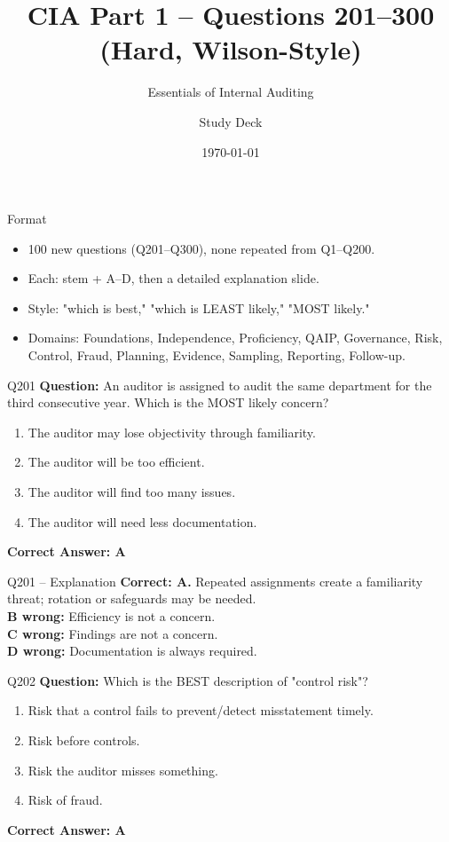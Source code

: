 \documentclass[aspectratio=169,10pt]{beamer}
\title{CIA Part 1 -- Questions 201--300 (Hard, Wilson-Style)}
\subtitle{Essentials of Internal Auditing}
\author{Study Deck}
\date{\today}
\begin{document}
	
	\begin{frame}
		\titlepage
	\end{frame}
	
	\begin{frame}{Format}
		\begin{itemize}
			\item 100 new questions (Q201--Q300), none repeated from Q1--Q200.
			\item Each: stem + A--D, then a detailed explanation slide.
			\item Style: "which is best," "which is LEAST likely," "MOST likely."
			\item Domains: Foundations, Independence, Proficiency, QAIP, Governance, Risk, Control, Fraud, Planning, Evidence, Sampling, Reporting, Follow-up.
		\end{itemize}
	\end{frame}
	
	\begin{frame}[t]{Q201}
		\small
		\textbf{Question:} An auditor is assigned to audit the same department for the third consecutive year. Which is the MOST likely concern?
		\begin{enumerate}[label=\Alph*.,itemsep=1pt,topsep=2pt]
			\item The auditor may lose objectivity through familiarity.
			\item The auditor will be too efficient.
			\item The auditor will find too many issues.
			\item The auditor will need less documentation.
		\end{enumerate}
		\vspace{4pt}
		\textbf{Correct Answer: A}
	\end{frame}
	
	\begin{frame}[t]{Q201 -- Explanation}
		\small
		\textbf{Correct: A.} Repeated assignments create a familiarity threat; rotation or safeguards may be needed. \\[4pt]
		\textbf{B wrong:} Efficiency is not a concern. \\[2pt]
		\textbf{C wrong:} Findings are not a concern. \\[2pt]
		\textbf{D wrong:} Documentation is always required.
	\end{frame}
	
	\begin{frame}[t]{Q202}
		\small
		\textbf{Question:} Which is the BEST description of "control risk"?
		\begin{enumerate}[label=\Alph*.,itemsep=1pt,topsep=2pt]
			\item Risk that a control fails to prevent/detect misstatement timely.
			\item Risk before controls.
			\item Risk the auditor misses something.
			\item Risk of fraud.
		\end{enumerate}
		\vspace{4pt}
		\textbf{Correct Answer: A}
	\end{frame}
	
\end{document}
